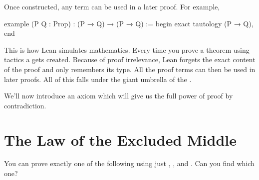 \documentclass[letterpaper,10pt,english]{sphinxmanual}
\begin{document}
\sphinxAtStartPar
Once constructed, any term can be used in a later proof. For example,

\begin{sphinxVerbatim}[commandchars=\\\{\}]
example (P Q : Prop) : (P → Q) → (P → Q) :=
begin
  exact tautology (P → Q),
end
\end{sphinxVerbatim}

\sphinxAtStartPar
This is how Lean simulates mathematics.
Every time you prove a theorem using tactics a  gets created.
Because of proof irrelevance, Lean forgets the exact content of the proof and
only remembers its type.
All the proof terms can then be used in later proofs.
All of this falls under the giant umbrella of the .

\sphinxAtStartPar
We’ll now introduce an axiom which will give us the full power of proof by contradiction.


\section{The Law of the Excluded Middle}
\label{\detokenize{day2:the-law-of-the-excluded-middle}}
\sphinxAtStartPar
You can prove exactly one of the following using just , , and .
Can you find which one?
\end{document}
